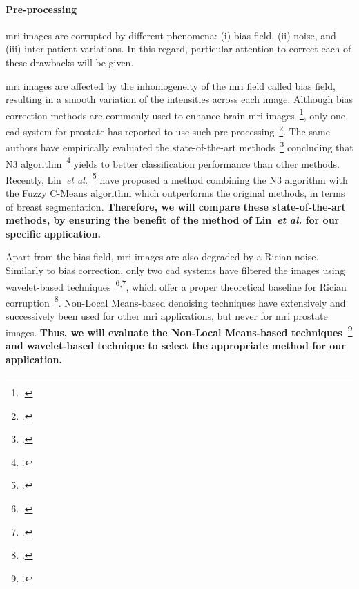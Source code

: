 \paragraph{Pre-processing}

\Ac{mri} images are corrupted by different phenomena: (i) bias field, (ii) noise, and (iii) inter-patient variations.
In this regard, particular attention to correct each of these drawbacks will be given.

\Ac{mri} images are affected by the inhomogeneity of the \ac{mri} field called bias field, resulting in a smooth variation of the intensities across each image.
Although bias correction methods are commonly used to enhance brain \ac{mri} images~\footcite{Vovk2007}, only one \ac{cad} system for prostate has reported to use such pre-processing~\footcite{Viswanath2009}.
The same authors have empirically evaluated the state-of-the-art methods~\footcite{viswanath2011empirical} concluding that N3 algorithm~\footcite{Sled1998} yields to better classification performance than other methods.
Recently, Lin~\emph{et al.}~\footcite{Lin2011} have proposed a method combining the N3 algorithm with the Fuzzy C-Means algorithm which outperforms the original methods, in terms of breast segmentation.
\textbf{Therefore, we will compare these state-of-the-art methods, by ensuring the benefit of the method of Lin~\emph{et al.} for our specific application.}

Apart from the bias field, \Ac{mri} images are also degraded by a Rician noise. 
Similarly to bias correction, only two \ac{cad} systems have filtered the images using wavelet-based techniques~\footcite{Mallat2008}\textsuperscript{,}\footcite{Pizurica2003}, which offer a proper theoretical baseline for Rician corruption~\footcite{Nowak1999}.
Non-Local Means-based denoising techniques have extensively and successively been used for other \ac{mri} applications, but never for \ac{mri} prostate images.
\textbf{Thus, we will evaluate the Non-Local Means-based techniques~\footcite{Manjon2012} and wavelet-based technique to select the appropriate method for our application.}

